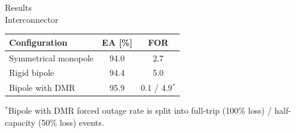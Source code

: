 \begin{frame}{Results\\Interconnector}
  \vspace{0.8em}
  {\centering
  \renewcommand{\arraystretch}{1.45}
  \begin{tabular}{@{}l c c@{}}
    \textbf{Configuration} & \textbf{EA [\%]} & \textbf{FOR} \\
    \hline
    Symmetrical monopole & 94.0 & 2.7 \\
    Rigid bipole         & 94.4 & 5.0 \\
    Bipole with DMR & 95.9 & 0.1 / 4.9$^{*}$ \\
    \hline
  \end{tabular}\par}
  \vspace{0.8em}
  {\color{atGray}\footnotesize $^{*}$Bipole with DMR forced outage rate is split into full-trip (100\% loss) / half-capacity (50\% loss) events.}
\end{frame}

